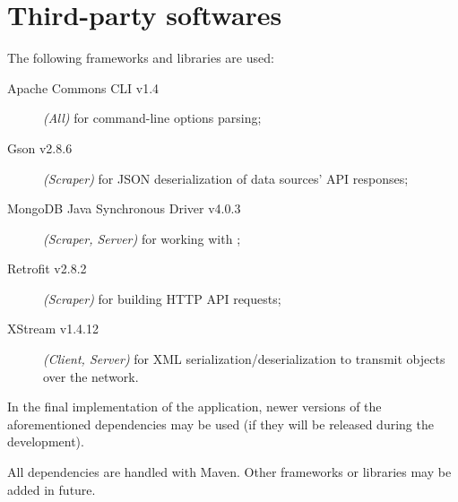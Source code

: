 \section{Third-party softwares}\label{sec:dependencies}

The following frameworks and libraries are used:
\begin{description}
	\item[Apache Commons CLI v1.4] \textit{(All)} for command-line options
		parsing;
	\item[Gson v2.8.6] \textit{(Scraper)} for JSON deserialization of data
		sources' API responses;
	\item[MongoDB Java Synchronous Driver v4.0.3] \textit{(Scraper, Server)}
		for working with \mongodb{};
	\item[Retrofit v2.8.2] \textit{(Scraper)} for building HTTP API
		requests;
	\item[XStream v1.4.12] \textit{(Client, Server)} for XML
		serialization/deserialization to transmit objects over the
		network.
\end{description}

In the final implementation of the application, newer versions of the
aforementioned dependencies may be used (if they will be released during the
development).

All dependencies are handled with Maven. Other frameworks or libraries may be
added in future.
